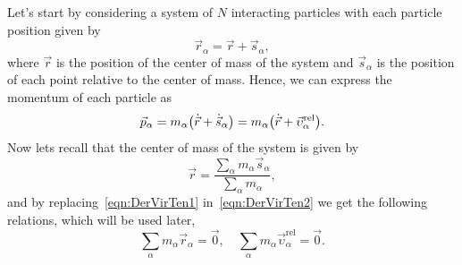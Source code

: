 Let's start by considering a system of $N$ interacting particles with each particle position given by
\begin{equation}
    \vec{r}_{\alpha} = \vec{r} + \vec{s}_{\alpha}\label{eqn:DerVirTen1},
\end{equation}
where $\vec{r}$ is the position of the center of mass of the system and $\vec{s}_\alpha$ is the position of each point relative to the center of mass.
Hence, we can express the momentum of each particle as
\begin{equation}
    \vec{p}_\alpha = m_\alpha\qty(\dot{\vec{r}}+\dot{\vec{s}}_\alpha) = m_\alpha\qty(\dot{\vec{r}}+\vec{\upsilon}_\alpha^{\mathrm{rel}}).\label{eqn:DerVirTen2}
\end{equation}
Now lets recall that the center of mass of the system is given by
\begin{equation}
    \vec{r} = \frac{\sum_{\alpha}m_\alpha\vec{s}_\alpha}{\sum_{\alpha}m_\alpha}\label{eqn:DerVirTen3},
\end{equation}
and by replacing~\eqref{eqn:DerVirTen1} in~\eqref{eqn:DerVirTen2} we get the following relations, which will be used later,
\begin{equation}
    \sum_\alpha m_\alpha\vec{r}_\alpha = \vec{0},\quad
    \sum_\alpha m_\alpha\vec{\upsilon}_\alpha^{\mathrm{rel}} = \vec{0}.\label{eqn:DerVirTen4}
\end{equation}

